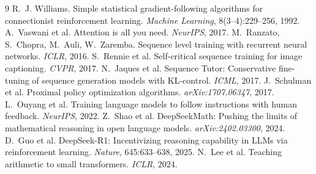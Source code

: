 \documentclass[10pt,twocolumn]{article}
\begin{document}
\begin{thebibliography}{9}
\small
{} R.~J. Williams. Simple statistical gradient-following algorithms for
connectionist reinforcement learning. \emph{Machine Learning}, 8(3--4):229--256, 1992.
 A.~Vaswani et al. Attention is all you need. \emph{NeurIPS}, 2017.
 M.~Ranzato, S.~Chopra, M.~Auli, W.~Zaremba. Sequence level training with
recurrent neural networks. \emph{ICLR}, 2016.
 S.~Rennie et al. Self-critical sequence training for image captioning.
\emph{CVPR}, 2017.
 N.~Jaques et al. Sequence Tutor: Conservative fine-tuning of sequence
generation models with KL-control. \emph{ICML}, 2017.
 J.~Schulman et al. Proximal policy optimization algorithms.
\emph{arXiv:1707.06347}, 2017.
 L.~Ouyang et al. Training language models to follow instructions with human
feedback. \emph{NeurIPS}, 2022.
 Z.~Shao et al. DeepSeekMath: Pushing the limits of mathematical reasoning in
open language models. \emph{arXiv:2402.03300}, 2024.
 D.~Guo et al. DeepSeek-R1: Incentivizing reasoning capability in LLMs via
reinforcement learning. \emph{Nature}, 645:633--638, 2025.
 N.~Lee et al. Teaching arithmetic to small transformers. \emph{ICLR}, 2024.
\end{thebibliography}
\end{document}
